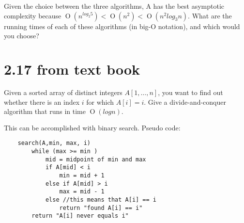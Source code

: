 \documentclass[12pt]{article}
\newcommand{\BigO}[1]{\ensuremath{\operatorname{O}\left(#1\right)}}
\begin{document}
Given the choice between the three algorithms, A has the best asymptotic
complexity because $\BigO{n^{log_2 5}} < \BigO{n^{2}} < \BigO{n^{2}log_3 n}$.
\noindent What are the running times of each of these algorithms (in big-O
notation), and which would you choose?

\section*{2.17 from text book}

Given a sorted array of distinct integers $A[1, \dots , n]$, you want to
find out whether there is an index $i$ for which $A[i] = i$. Give a
divide-and-conquer algorithm that runs in time $\BigO{log n}$.

This can be accomplished with binary search.
Pseudo code:
\begin{verbatim}
	search(A,min, max, i)
		while (max >= min )
			mid = midpoint of min and max
			if A[mid] < i
				min = mid + 1
			else if A[mid] > i
				max = mid - 1
			else //this means that A[i] == i
				return "found A[i] == i"
		return "A[i] never equals i"
\end{verbatim}
\end{document}
